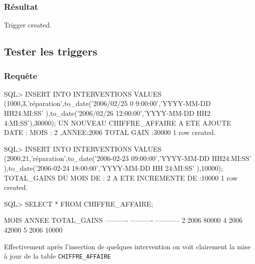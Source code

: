 \documentclass[•]{article}
\begin{document}
\subsubsection{Résultat}
\begin{sql}
Trigger created.
\end{sql}

\subsection{Tester les triggers}

\subsubsection{Requête}
\begin{sql}
SQL> INSERT INTO INTERVENTIONS VALUES (1000,3,'réparation',to_date('2006/02/25 0
9:00:00','YYYY-MM-DD HH24:MI:SS' ),to_date('2006/02/26 12:00:00','YYYY-MM-DD HH2
4:MI:SS'),30000);
UN NOUVEAU CHIFFRE_AFFAIRE A ETE AJOUTE
DATE : MOIS : 2 ,ANNEE:2006 TOTAL GAIN :30000
1 row created.

SQL> INSERT INTO INTERVENTIONS VALUES (2000,21,'réparation',to_date('2006-02-23
09:00:00','YYYY-MM-DD HH24:MI:SS' ),to_date('2006-02-24 18:00:00','YYYY-MM-DD HH
24:MI:SS' ),10000);
TOTAL_GAINS DU MOIS DE : 2 A ETE INCREMENTE DE :10000
1 row created.

SQL> SELECT * FROM CHIFFRE_AFFAIRE;

      MOIS      ANNEE TOTAL_GAINS
---------- ---------- -----------
         2       2006       80000
         4       2006       42000
         5       2006       10000
\end{sql}

Effectivement après l'insertion de quelques intervention on voit clairement la mise à jour de la table \texttt{CHIFFRE\_AFFAIRE}
\end{document}

